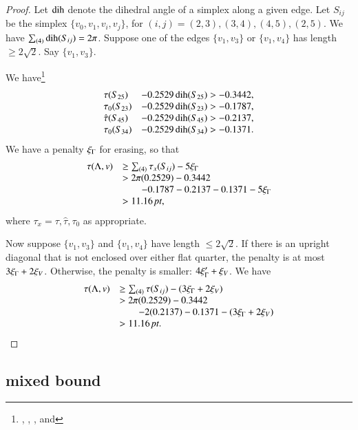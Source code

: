\begin{proof}
Let $\operatorname{dih}$ denote the dihedral angle of a simplex along a given
edge. Let $S_{ij}$ be the simplex $\{v_0,v_1,v_i,v_j\}$, for
$(i,j)=(2,3),(3,4), (4,5),(2,5)$. We have $\sum_{(4)}\operatorname{dih}(S_{ij})
= 2\pi$. Suppose one of the edges $\{v_1,v_3\}$ or $\{v_1,v_4\}$ has
length $\ge2\sqrt2$. Say $\{v_1,v_3\}$.

We have\footnote{, ,
, and }
    $$
    \begin{array}{lll}
    \tau(S_{25}) &- 0.2529\operatorname{dih}(S_{25}) > -0.3442,\\
    \tau_0(S_{23}) &- 0.2529\operatorname{dih}(S_{23}) > -0.1787,\\
    \hat\tau(S_{45}) &- 0.2529\operatorname{dih}(S_{45}) > -0.2137,\\
    \tau_0(S_{34}) &- 0.2529\operatorname{dih}(S_{34}) > -0.1371.\\
    \end{array}
    $$
We have a penalty $\xi_\Gamma$ for erasing, so that
    $$
    \begin{array}{lll}
        \tau(\Lambda,v) &\ge \sum_{(4)}\tau_x(S_{ij}) - 5\xi_\Gamma\\
                &>2\pi(0.2529)-0.3442\\
                &\qquad -0.1787-0.2137-0.1371-5\xi_\Gamma\\
                &>11.16\,\hbox{\it pt},
    \end{array}
    $$
where $\tau_x=\tau,\hat\tau,\tau_0$ as appropriate.

Now suppose $\{v_1,v_3\}$ and $\{v_1,v_4\}$ have length $\le2\sqrt2$.
If there is an upright diagonal that is not enclosed over either
flat quarter, the penalty is at most $3\xi_\Gamma+2\xi_V$. Otherwise, the
penalty is smaller: $4\xi_\Gamma'+\xi_V$. We have
    $$
    \begin{array}{lll}
    \tau(\Lambda,v)
    &\ge \sum_{(4)}\tau(S_{ij})-(3\xi_\Gamma+2\xi_V)\\
    &>2\pi(0.2529)-0.3442\\
    &\qquad -2(0.2137)-0.1371 -(3\xi_\Gamma+2\xi_V)\\
    &>11.16\,\hbox{\it pt}.\\
    \end{array}
    $$
\end{proof}




\subsection{mixed bound} %

